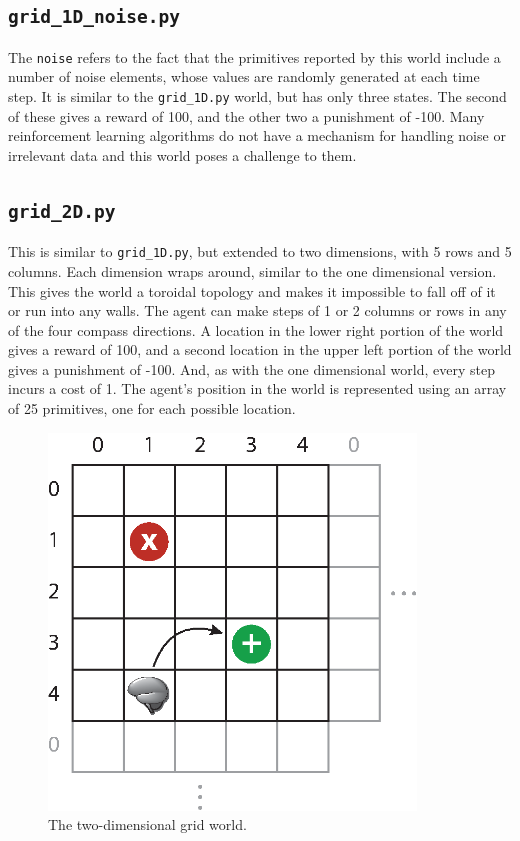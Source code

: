 \subsection{\texttt{grid\_1D\_noise.py}}

The \texttt{noise} refers to the fact that the primitives reported by this world include a number of noise elements, whose values are randomly generated at each time step. It is similar to the  \texttt{grid\_1D.py} world, but has only three states.  The second of these gives a reward of 100, and the other two a punishment of -100. Many reinforcement learning algorithms do not have a mechanism for handling noise or irrelevant data and this world poses a challenge to them. 

\subsection{\texttt{grid\_2D.py}}

This is similar to \texttt{grid\_1D.py}, but extended to two dimensions, with 5 rows and 5 columns. Each dimension wraps around, similar to the one dimensional version. This gives the world a toroidal topology and makes it impossible to fall off of it or run into any walls. The agent can make steps of 1 or 2 columns or rows in any of the four compass directions. A location in the lower right portion of the world gives a reward of 100, and a second location in the upper left portion of the world gives a punishment of -100. And, as with the one dimensional world, every step incurs a cost of 1. The agent's position in the world is represented using an array of 25 primitives, one for each possible location. 

\begin{figure}
\centering
\includegraphics[height=10cm]{figs/grid_world_2D.eps}
\caption{The two-dimensional grid world.}
\label{grid_2D}
\end{figure}

